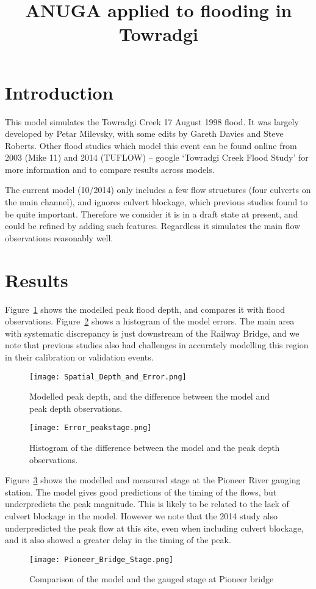 \documentclass{article}
\begin{document}
\title{ANUGA applied to flooding in Towradgi}

\maketitle

\section{Introduction}
This model simulates the Towradgi Creek 17 August 1998 flood. It was largely
developed by Petar Milevsky, with some edits by Gareth Davies and Steve
Roberts. Other flood studies which model this event can be found online from
2003 (Mike 11) and 2014 (TUFLOW) -- google `Towradgi Creek Flood Study' for
more information and to compare results across models. 

The current model (10/2014) only includes a few flow structures (four culverts
on the main channel), and ignores culvert blockage, which previous studies
found to be quite important. Therefore we consider it is in a draft state at
present, and could be refined by adding such features. Regardless it simulates
the main flow observations reasonably well.

\section{Results}

Figure~\ref{fig:spatial} shows the modelled peak flood depth, and compares it with flood
observations. Figure~\ref{fig:hist} shows a histogram of the model errors. The main area
with systematic discrepancy is just downstream of the Railway Bridge, and we
note that previous studies also had challenges in accurately modelling this
region in their calibration or validation events. 

\begin{figure}
\center
\texttt{[image: Spatial\_Depth\_and\_Error.png]}
\caption{Modelled peak depth, and the difference between the model and peak depth observations.}
\label{fig:spatial}
\end{figure}

\begin{figure}
\center
\texttt{[image: Error\_peakstage.png]}
\caption{Histogram of the difference between the model and the peak depth observations.}
\label{fig:hist}
\end{figure}

Figure~\ref{fig:pioneer} shows the modelled and measured stage at the Pioneer
River gauging station. The model gives good predictions of the timing of the
flows, but underpredicts the peak magnitude. This is likely to be related to
the lack of culvert blockage in the model. However we note that the 2014 study
also underpredicted the peak flow at this site, even when including culvert
blockage, and it also showed a greater delay in the timing of the peak. 

\begin{figure}
\center
\texttt{[image: Pioneer\_Bridge\_Stage.png]}
\caption{Comparison of the model and the gauged stage at Pioneer bridge}
\label{fig:pioneer}
\end{figure}
\end{document}
